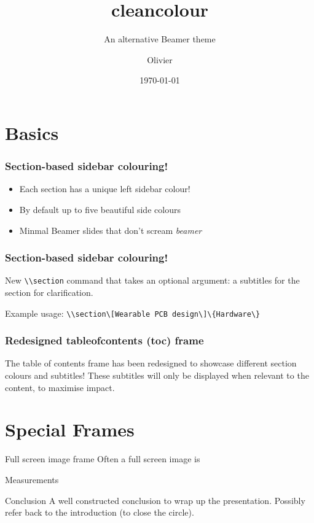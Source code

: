 \documentclass[english]{beamer}
\title{cleancolour}
\date{\today}
\author[Pieters]{Olivier}
\subtitle{An alternative Beamer theme}
\newenvironment{citemize}{\begin{itemize}[label={}]\Large\setlength\itemsep{1cm}\raggedright}{\end{itemize}}
\begin{document}
\titleframe


\tocframe

\section[Absolute Theme Basics]{Basics}

\begin{frame}
  \frametitle{Section-based sidebar colouring!}
  \begin{citemize}
    \item Each section has a unique left sidebar colour!
    \item By default up to five beautiful side colours
    \item Minmal Beamer slides that don't scream \emph{beamer}
  \end{citemize}
\end{frame}

\begin{frame}
  \frametitle{Section-based sidebar colouring!}
  New \lstinline|\\section| command that takes an optional argument: a subtitles for the section for clarification.

  Example usage: \lstinline|\\section\[Wearable PCB design\]\{Hardware\}|
\end{frame}

\begin{frame}
\frametitle{Redesigned tableofcontents (toc) frame}
The table of contents frame has been redesigned to showcase different section colours and subtitles! These subtitles will only be displayed when relevant to the content, to maximise impact.
\end{frame}

\tocframe

\section[Useful helpers for common problems]{Special Frames}

\begin{frame}{Full screen image frame}
\centering
Often a full screen image is
\end{frame}

\tocframe

\begin{frame}{Measurements}
\centering
\end{frame}

\tocframe

\begin{frame}{Conclusion}
A well constructed conclusion to wrap up the presentation. Possibly refer back to the introduction (to close the circle).
\end{frame}

\end{document}
